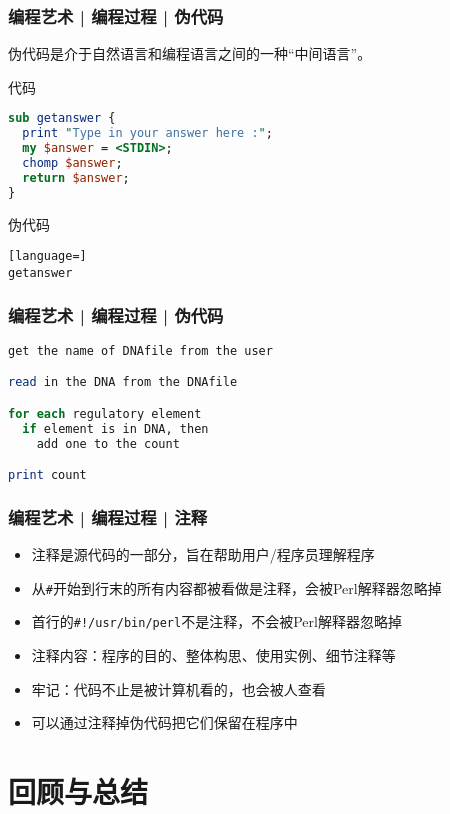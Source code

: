 \begin{frame}[fragile]
  \frametitle{编程艺术 | 编程过程 | 伪代码}
伪代码是介于自然语言和编程语言之间的一种“中间语言”。
  \begin{block}{代码}
\begin{lstlisting}[language=Perl]
sub getanswer {
  print "Type in your answer here :";  
  my $answer = <STDIN>;
  chomp $answer;
  return $answer;
}
\end{lstlisting}
\end{block}
\pause
\begin{block}{伪代码}
\begin{lstlisting}[language=]
getanswer
\end{lstlisting}
\end{block}
\end{frame}

\begin{frame}[fragile]
  \frametitle{编程艺术 | 编程过程 | \alert{伪代码}}
\begin{lstlisting}[language=Perl]
get the name of DNAfile from the user

read in the DNA from the DNAfile

for each regulatory element
  if element is in DNA, then
    add one to the count

print count
\end{lstlisting}
\end{frame}

\begin{frame}[fragile]
  \frametitle{编程艺术 | 编程过程 | \alert{注释}}
  \begin{itemize}
    \item 注释是源代码的一部分，旨在帮助用户/程序员理解程序
    \item 从\verb|#|开始到行末的所有内容都被看做是注释，会被Perl解释器忽略掉
    \item 首行的\verb|#!/usr/bin/perl|不是注释，不会被Perl解释器忽略掉
    \item 注释内容：程序的目的、整体构思、使用实例、细节注释等
    \item 牢记：代码不止是被计算机看的，也会被人查看
    \item 可以通过注释掉伪代码把它们保留在程序中
  \end{itemize}
\end{frame}

\section{回顾与总结}
